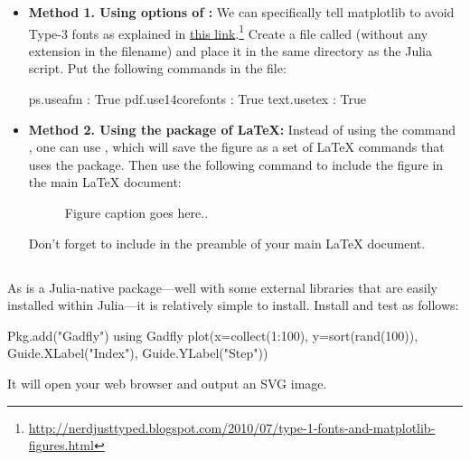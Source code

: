 \begin{itemize}
\item \textbf{Method 1. Using options of :}
We can specifically tell matplotlib to avoid Type-3 fonts as explained in \href{http://nerdjusttyped.blogspot.com/2010/07/type-1-fonts-and-matplotlib-figures.html}{this link}.\footnote{\url{http://nerdjusttyped.blogspot.com/2010/07/type-1-fonts-and-matplotlib-figures.html}} Create a file called  (without any extension in the filename) and place it in the same directory as the Julia script. Put the following commands in the  file:
\begin{code}
ps.useafm           : True
pdf.use14corefonts  : True
text.usetex         : True
\end{code}

\item \textbf{Method 2. Using the  package of \LaTeX{}:}
Instead of using the command , one can use , which will save the figure as a set of \LaTeX{} commands that uses the  package. Then use the following command to include the figure in the main \LaTeX{} document:
\begin{code}
\begin{figure} \centering
\resizebox{0.7\textwidth}{!}{}
\caption{Figure caption goes here..}
\label{fig:myplot}
\end{figure}
\end{code}
Don't forget to include  in the preamble of your main \LaTeX{} document.

\end{itemize}







\subsection{}

As  is a Julia-native package---well with some external libraries that are easily installed within Julia---it is relatively simple to install. Install and test as follows:
\begin{code}
Pkg.add("Gadfly")
using Gadfly
plot(x=collect(1:100), y=sort(rand(100)),
     Guide.XLabel("Index"), Guide.YLabel("Step"))
\end{code}
\noindent It will open your web browser and output an SVG image.

